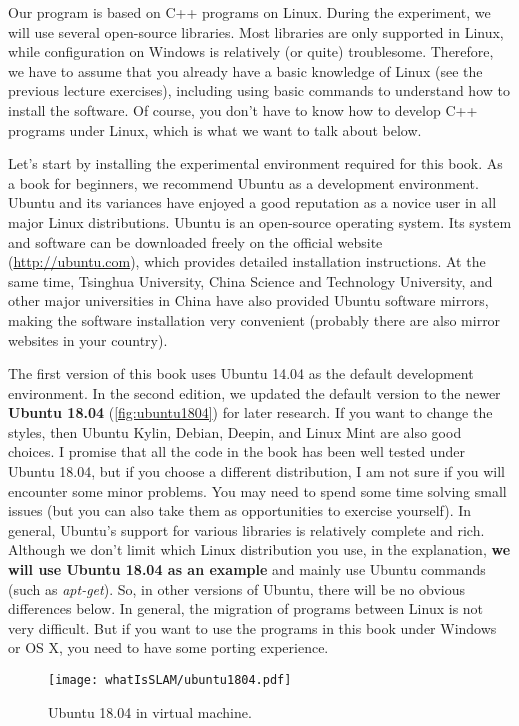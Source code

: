 Our program is based on C++ programs on Linux. During the experiment, we will use several open-source libraries. Most libraries are only supported in Linux, while configuration on Windows is relatively (or quite) troublesome. Therefore, we have to assume that you already have a basic knowledge of Linux (see the previous lecture exercises), including using basic commands to understand how to install the software. Of course, you don't have to know how to develop C++ programs under Linux, which is what we want to talk about below.

Let's start by installing the experimental environment required for this book. As a book for beginners, we recommend Ubuntu as a development environment. Ubuntu and its variances have enjoyed a good reputation as a novice user in all major Linux distributions. Ubuntu is an open-source operating system. Its system and software can be downloaded freely on the official website (\url{http://ubuntu.com}), which provides detailed installation instructions. At the same time, Tsinghua University, China Science and Technology University, and other major universities in China have also provided Ubuntu software mirrors, making the software installation very convenient (probably there are also mirror websites in your country).

The first version of this book uses Ubuntu 14.04 as the default development environment. In the second edition, we updated the default version to the newer \textbf{Ubuntu 18.04} (\autoref{fig:ubuntu1804}) for later research. If you want to change the styles, then Ubuntu Kylin, Debian, Deepin, and Linux Mint are also good choices. I promise that all the code in the book has been well tested under Ubuntu 18.04, but if you choose a different distribution, I am not sure if you will encounter some minor problems. You may need to spend some time solving small issues (but you can also take them as opportunities to exercise yourself). In general, Ubuntu's support for various libraries is relatively complete and rich. Although we don't limit which Linux distribution you use, in the explanation, \textbf{we will use Ubuntu 18.04 as an example} and mainly use Ubuntu commands (such as \textit{apt-get}). So, in other versions of Ubuntu, there will be no obvious differences below. In general, the migration of programs between Linux is not very difficult. But if you want to use the programs in this book under Windows or OS X, you need to have some porting experience.

\begin{figure}[!ht]
    \centering
    \texttt{[image: whatIsSLAM/ubuntu1804.pdf]}
    \caption{Ubuntu 18.04 in virtual machine.}
    \label{fig:ubuntu1804}
\end{figure}


